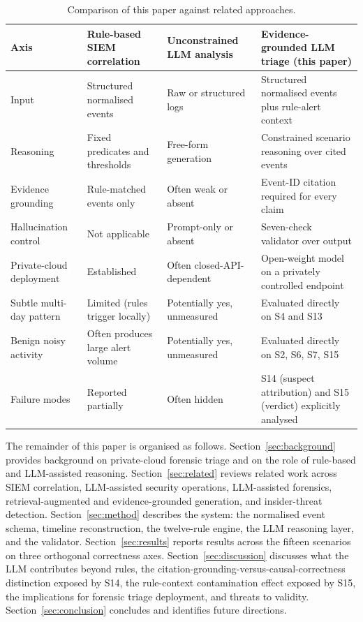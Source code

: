 \documentclass[conference]{IEEEtran}
\begin{document}
\begin{table}[ht]
\centering
\caption{Comparison of this paper against related approaches.}
\label{tab:positioning}
\small
\begin{tabular}{L{0.16\textwidth}L{0.22\textwidth}L{0.22\textwidth}L{0.30\textwidth}}
\toprule
\textbf{Axis} & \textbf{Rule-based SIEM correlation} & \textbf{Unconstrained LLM analysis} & \textbf{Evidence-grounded LLM triage (this paper)} \\
\midrule
Input & Structured normalised events & Raw or structured logs & Structured normalised events plus rule-alert context \\
Reasoning & Fixed predicates and thresholds & Free-form generation & Constrained scenario reasoning over cited events \\
Evidence grounding & Rule-matched events only & Often weak or absent & Event-ID citation required for every claim \\
Hallucination control & Not applicable & Prompt-only or absent & Seven-check validator over output \\
Private-cloud deployment & Established & Often closed-API-dependent & Open-weight model on a privately controlled endpoint \\
Subtle multi-day pattern & Limited (rules trigger locally) & Potentially yes, unmeasured & Evaluated directly on S4 and S13 \\
Benign noisy activity & Often produces large alert volume & Potentially yes, unmeasured & Evaluated directly on S2, S6, S7, S15 \\
Failure modes & Reported partially & Often hidden & S14 (suspect attribution) and S15 (verdict) explicitly analysed \\
\bottomrule
\end{tabular}
\end{table}

The remainder of this paper is organised as follows. Section~\ref{sec:background} provides background on private-cloud forensic triage and on the role of rule-based and LLM-assisted reasoning. Section~\ref{sec:related} reviews related work across SIEM correlation, LLM-assisted security operations, LLM-assisted forensics, retrieval-augmented and evidence-grounded generation, and insider-threat detection. Section~\ref{sec:method} describes the system: the normalised event schema, timeline reconstruction, the twelve-rule engine, the LLM reasoning layer, and the validator. Section~\ref{sec:results} reports results across the fifteen scenarios on three orthogonal correctness axes. Section~\ref{sec:discussion} discusses what the LLM contributes beyond rules, the citation-grounding-versus-causal-correctness distinction exposed by S14, the rule-context contamination effect exposed by S15, the implications for forensic triage deployment, and threats to validity. Section~\ref{sec:conclusion} concludes and identifies future directions.
\end{document}
